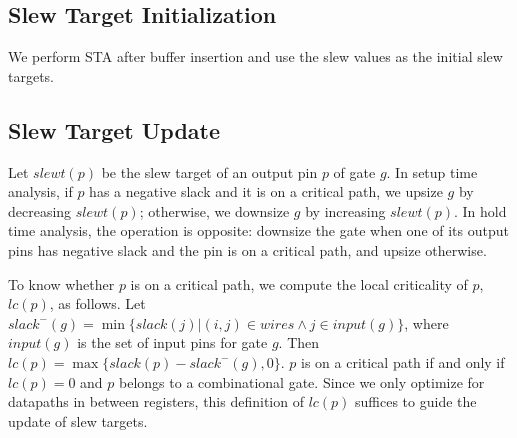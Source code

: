 

\subsection{Slew Target Initialization}
We perform STA after buffer insertion and use the slew values as the initial slew targets.

\subsection{Slew Target Update}

Let $slewt(p)$ be the slew target of an output pin $p$ of gate $g$. In setup time analysis, if $p$ has a negative slack and it is on a critical path, we upsize $g$ by decreasing $slewt(p)$; otherwise, we downsize $g$ by increasing $slewt(p)$. In hold time analysis, the operation is opposite: downsize the gate when one of its output pins has negative slack and the pin is on a critical path, and upsize otherwise.

To know whether $p$ is on a critical path, we compute the local criticality of $p$, $lc(p)$, as follows. Let $slack^{-}(g) = \min\{slack(j) | (i, j) \in wires \land j \in input(g)\}$, where $input(g)$ is the set of input pins for gate $g$. Then $lc(p) = \max\{slack(p) - slack^{-}(g), 0\}$. $p$ is on a critical path if and only if $lc(p) = 0$ and $p$ belongs to a combinational gate. Since we only optimize for datapaths in between registers, this definition of $lc(p)$ suffices to guide the update of slew targets.

